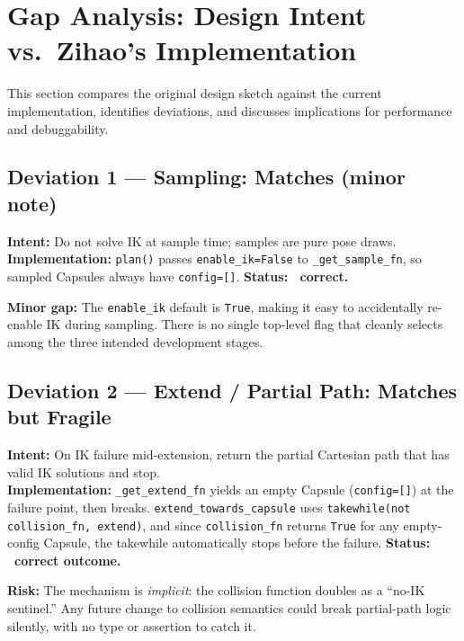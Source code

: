 \documentclass[11pt]{article}
\begin{document}
\newpage
\section*{Gap Analysis: Design Intent vs.\ Zihao's Implementation}

This section compares the original design sketch against the current implementation,
identifies deviations, and discusses implications for performance and debuggability.

\subsection*{Deviation 1 — Sampling: Matches (minor note)}

\textbf{Intent:} Do not solve IK at sample time; samples are pure pose draws.\\
\textbf{Implementation:} \texttt{plan()} passes \texttt{enable\_ik=False} to
\texttt{\_get\_sample\_fn}, so sampled Capsules always have \texttt{config=[]}.
\textbf{Status: \checkmark~correct.}

\noindent\textbf{Minor gap:} The \texttt{enable\_ik} default is \texttt{True}, making it
easy to accidentally re-enable IK during sampling. There is no single top-level flag
that cleanly selects among the three intended development stages.

\subsection*{Deviation 2 — Extend / Partial Path: Matches but Fragile}

\textbf{Intent:} On IK failure mid-extension, return the partial Cartesian path that
has valid IK solutions and stop.\\
\textbf{Implementation:} \texttt{\_get\_extend\_fn} yields an empty Capsule
(\texttt{config=[]}) at the failure point, then breaks.
\texttt{extend\_towards\_capsule} uses \texttt{takewhile(not collision\_fn, extend)},
and since \texttt{collision\_fn} returns \texttt{True} for any empty-config Capsule,
the takewhile automatically stops before the failure. \textbf{Status: \checkmark~correct outcome.}

\noindent\textbf{Risk:} The mechanism is \emph{implicit}: the collision function doubles as a
``no-IK sentinel.'' Any future change to collision semantics could break partial-path
logic silently, with no type or assertion to catch it.
\end{document}
